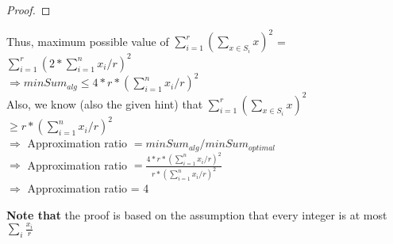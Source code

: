 \documentclass[11pt]{article}
\begin{document}
\begin{enumerate}
\begin{proof}
    \end{proof}
    Thus, maximum possible value of $\sum_{i=1}^r (\sum_{x \in S_i} x)^2$ = $\sum_{i=1}^r (2*\sum_{i=1}^n x_i/r)^2$ \\
    $\Longrightarrow minSum_{alg} \leq 4*r*(\sum_{i=1}^n x_i/r)^2$ \\
    Also, we know (also the given hint) that $\sum_{i=1}^r (\sum_{x \in S_i} x)^2$ $\geq r*(\sum_{i=1}^n x_i/r)^2$ \\
    $\Longrightarrow$ Approximation ratio $= minSum_{alg}/minSum_{optimal}$ \\
    $\Longrightarrow$ Approximation ratio $=  \frac{4*r*(\sum_{i=1}^n x_i/r)^2}{r*(\sum_{i=1}^n x_i/r)^2}$\\
    $\Longrightarrow$ Approximation ratio = 4
    
		{\bf Note that} the proof is based on the assumption that every integer is at most $\sum_i \frac{x_i}{r}$ 
\end{enumerate}
\newpage
\end{document}
